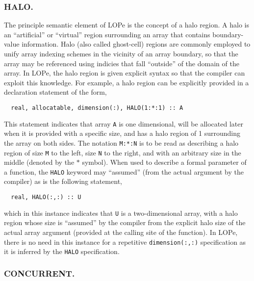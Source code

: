 \subsubsection{HALO.}

The principle semantic element of LOPe is the concept of a halo region.  A halo is an ``artificial''
or ``virtual'' region surrounding an array that contains boundary-value information.  Halo (also
called ghost-cell) regions are commonly employed to unify array indexing schemes in the vicinity of
an array boundary, so that the array may be referenced using indicies that fall ``outside'' of the
domain of the array.  In LOPe, the halo region is given explicit syntax so that the compiler can
exploit this knowledge.  For example, a halo region can be explicitly provided in a declaration
statement of the form,
\begin{verbatim}
  real, allocatable, dimension(:), HALO(1:*:1) :: A
\end{verbatim}
This statement indicates that array \texttt{A} is one dimensional, will be allocated later when it
is provided with a specific size, and has a halo region of 1 surrounding the array on both sides.
The notation \texttt{M:*:N} is to be read as describing a halo region of size \texttt{M} to the
left, size \texttt{N} to the right, and with an arbitrary size in the middle (denoted by the $*$
symbol).  When used to describe a formal parameter of a function, the \texttt{HALO} keyword may
``assumed'' (from the actual argument by the compiler) as is the following statement,
\begin{verbatim}
  real, HALO(:,:) :: U
\end{verbatim}
which in this instance indicates that \texttt{U} is a two-dimensional array, with a halo region
whose size is ``assumed'' by the compiler from the explicit halo size of the actual array argument
(provided at the calling site of the function).  In LOPe, there is no need in this instance for a
repetitive \texttt{dimension(:,:)} specification as it is inferred by the \texttt{HALO}
specification.

\subsubsection{CONCURRENT.}

